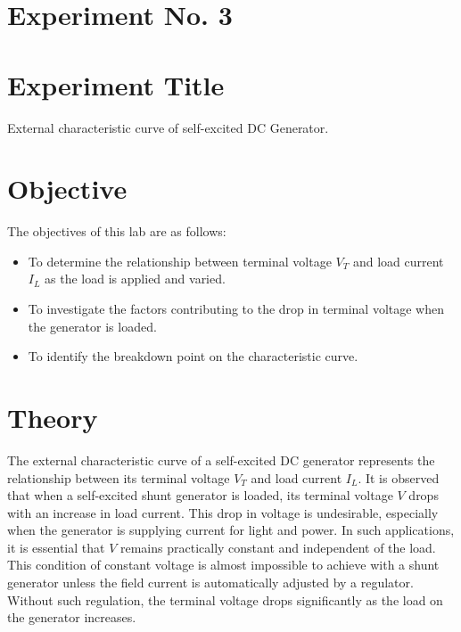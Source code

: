 \documentclass[a4paper,12pt]{article}
\begin{document}
\section{Experiment No. 3}


\section{Experiment Title }
External characteristic curve of self-excited DC Generator.
\section{Objective}
	The objectives of this lab are as follows:
\begin{itemize}
	\item To determine the relationship between terminal voltage \( V_T \) and load current \( I_L \) as the load is applied and varied.
	\item To investigate the factors contributing to the drop in terminal voltage when the generator is loaded.
	\item To identify the breakdown point on the characteristic curve.
	
\end{itemize}


\section{Theory}

The external characteristic curve of a self-excited DC generator represents the relationship between its terminal voltage \( V_T \) and load current \( I_L \). It is observed that when a self-excited shunt generator is loaded, its terminal voltage \( V \) drops with an increase in load current. This drop in voltage is undesirable, especially when the generator is supplying current for light and power. In such applications, it is essential that \( V \) remains practically constant and independent of the load. This condition of constant voltage is almost impossible to achieve with a shunt generator unless the field current is automatically adjusted by a regulator. Without such regulation, the terminal voltage drops significantly as the load on the generator increases.
\end{document}
